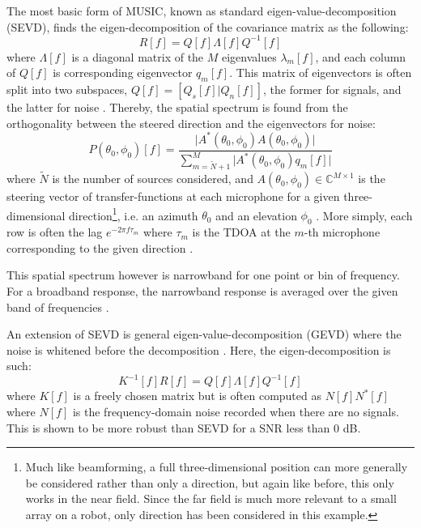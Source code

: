 \documentclass{report}
\begin{document}
The most basic form of MUSIC, known as standard eigen-value-decomposition (SEVD), finds the eigen-decomposition of the covariance matrix as the following:
\begin{equation}
R[f] = Q[f]\Lambda[f]Q^{-1}[f]
\end{equation}
where $\Lambda[f]$ is a diagonal matrix of the $M$ eigenvalues $\lambda_m[f]$, and each column of $Q[f]$ is corresponding eigenvector $q_m[f]$. This matrix of eigenvectors is often split into two subspaces, $Q[f] = [Q_s[f]|Q_n[f]]$, the former for signals, and the latter for noise \cite{rascon_localization_2017}. Thereby, the spatial spectrum is found from the orthogonality between the steered direction and the eigenvectors for noise:
\begin{equation}
P(\theta_0, \phi_0)[f] = \frac{\lvert A^*(\theta_0, \phi_0) A(\theta_0, \phi_0) \rvert}
	{\sum_{m=\tilde{N}+1}^M \lvert A^*(\theta_0, \phi_0) q_m[f] \rvert}
\end{equation}
where $\tilde{N}$ is the number of sources considered, and $A(\theta_0, \phi_0)\in \mathbb{C}^{M\times 1}$ is the steering vector of transfer-functions at each microphone for a given three-dimensional direction\footnote{Much like beamforming, a full three-dimensional position can more generally be considered rather than only a direction, but again like before, this only works in the near field. Since the far field is much more relevant to a small array on a robot, only direction has been considered in this example.}, i.e. an azimuth $\theta_0$ and an elevation $\phi_0$ \cite{nakamura_real-time_2012}. More simply, each row is often the lag $e^{-2\pi f\tau_m}$ where $\tau_m$ is the TDOA at the $m$-th microphone corresponding to the given direction \cite{rascon_localization_2017}.

This spatial spectrum however is narrowband for one point or bin of frequency. For a broadband response, the narrowband response is averaged over the given band of frequencies \cite{ishi_effects_2011} \cite{nakamura_real-time_2012}.

An extension of SEVD is general eigen-value-decomposition (GEVD) where the noise is whitened before the decomposition \cite{nakamura_intelligent_2009} \cite{nakamura_intelligent_2011} \cite{nakamura_real-time_2012}. Here, the eigen-decomposition is such:
\begin{equation}
K^{-1}[f] R[f] = Q[f] \Lambda[f] Q^{-1}[f]
\end{equation}
where $K[f]$ is a freely chosen matrix but is often computed as $N[f]N^*[f]$ where $N[f]$ is the frequency-domain noise recorded when there are no signals. This is shown to be more robust than SEVD for a SNR less than 0 \si{dB}.
\end{document}
